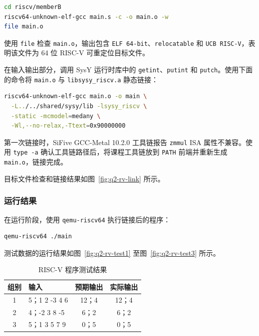 \begin{lstlisting}[language=bash]
cd riscv/memberB
riscv64-unknown-elf-gcc main.s -c -o main.o -w
file main.o
\end{lstlisting}

使用 \texttt{file} 检查 \texttt{main.o}，输出包含 \texttt{ELF 64-bit}、\texttt{relocatable} 和 \texttt{UCB RISC-V}，表明该文件为 64 位 RISC-V 可重定位目标文件。

在输入输出部分，调用 SysY 运行时库中的 \texttt{getint}、\texttt{putint} 和 \texttt{putch}。使用下面的命令将 \texttt{main.o} 与 \texttt{libsysy\_riscv.a} 静态链接：

\begin{lstlisting}[language=bash]
riscv64-unknown-elf-gcc main.o -o main \
  -L../../shared/sysy/lib -lsysy_riscv \
  -static -mcmodel=medany \
  -Wl,--no-relax,-Ttext=0x90000000
\end{lstlisting}

第一次链接时，SiFive GCC-Metal 10.2.0 工具链报告 \texttt{zmmul} ISA 属性不兼容。使用 \texttt{type -a} 确认工具链路径后，将课程工具链放到 \texttt{PATH} 前端并重新生成 \texttt{main.o}，链接完成。

目标文件检查和链接结果如图~\ref{fig:q2-rv-link} 所示。


\subsubsection{运行结果}

在运行阶段，使用 \texttt{qemu-riscv64} 执行链接后的程序：

\begin{lstlisting}[language=bash]
qemu-riscv64 ./main
\end{lstlisting}

测试数据的运行结果如图~\ref{fig:q2-rv-test1} 至图~\ref{fig:q2-rv-test3} 所示。


\begin{table}[H]
\centering

\begin{tabularx}{0.94\linewidth}{c X c c}
\toprule
组别 & 输入 & 预期输出 & 实际输出 \\
\midrule
1 & 5；1 2 -3 4 6 & 12；4 & 12；4 \\
2 & 4；-2 3 8 -5 & 6；2 & 6；2 \\
3 & 5；1 3 5 7 9 & 0；5 & 0；5 \\
\bottomrule
\end{tabularx}
\caption{RISC-V 程序测试结果}
\label{tab:q2-riscv-tests}
\end{table}

